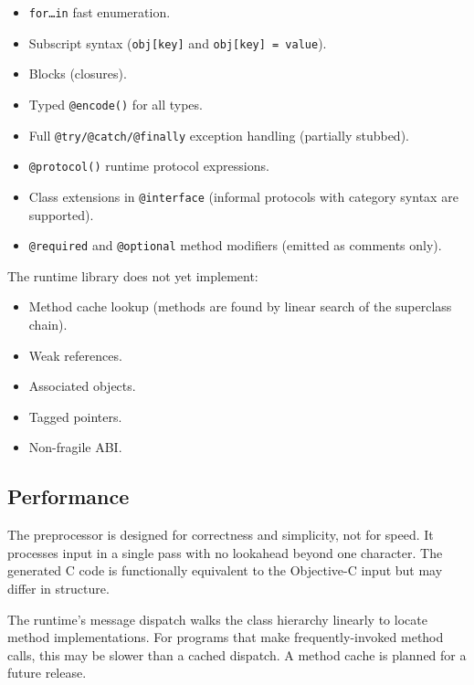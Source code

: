 \documentclass[11pt,twoside]{article}
\begin{document}
\begin{itemize}
  \item {\tt for\ldots in} fast enumeration.
  \item Subscript syntax ({\tt obj[key]} and {\tt obj[key] = value}).
  \item Blocks (closures).
  \item Typed {\tt @encode()} for all types.
  \item Full {\tt @try/@catch/@finally} exception handling (partially
        stubbed).
  \item {\tt @protocol()} runtime protocol expressions.
  \item Class extensions in {\tt @interface} (informal protocols with
        category syntax are supported).
  \item {\tt @required} and {\tt @optional} method modifiers (emitted
        as comments only).
\end{itemize}

The runtime library does not yet implement:

\begin{itemize}
  \item Method cache lookup (methods are found by linear search of the
        superclass chain).
  \item Weak references.
  \item Associated objects.
  \item Tagged pointers.
  \item Non-fragile ABI.
\end{itemize}

\subsection{Performance}

The preprocessor is designed for correctness and simplicity, not for
speed.  It processes input in a single pass with no lookahead beyond one
character.  The generated C code is functionally equivalent to the
Objective-C input but may differ in structure.

The runtime's message dispatch walks the class hierarchy linearly to
locate method implementations.  For programs that make frequently-invoked
method calls, this may be slower than a cached dispatch.  A method cache
is planned for a future release.
\end{document}
